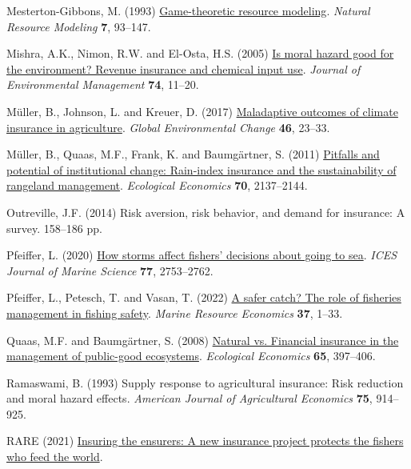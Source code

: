 \documentclass[
  letterpaper,
  DIV=11,
  numbers=noendperiod]{scrartcl}
\newlength{\cslhangindent}
\newenvironment{CSLReferences}[2] %
 {\begin{list}{}{%
  \setlength{\itemindent}{0pt}
  \setlength{\leftmargin}{0pt}
  \setlength{\parsep}{0pt}
  \ifodd #1
   \setlength{\leftmargin}{\cslhangindent}
   \setlength{\itemindent}{-1\cslhangindent}
  \fi
  \setlength{\itemsep}{#2\baselineskip}}}
 {\end{list}}
\theoremstyle{plain}
\theoremstyle{plain}
\theoremstyle{remark}
\begin{document}
\begin{CSLReferences}{1}{0}
Mesterton-Gibbons, M. (1993)
\href{https://doi.org/10.1111/j.1939-7445.1993.tb00143.x}{Game-theoretic
resource modeling}. \emph{Natural Resource Modeling} \textbf{7},
93--147.

Mishra, A.K., Nimon, R.W. and El-Osta, H.S. (2005)
\href{https://doi.org/10.1016/j.jenvman.2004.08.003}{Is moral hazard
good for the environment? Revenue insurance and chemical input use}.
\emph{Journal of Environmental Management} \textbf{74}, 11--20.

Müller, B., Johnson, L. and Kreuer, D. (2017)
\href{https://doi.org/10.1016/j.gloenvcha.2017.06.010}{Maladaptive
outcomes of climate insurance in agriculture}. \emph{Global
Environmental Change} \textbf{46}, 23--33.

Müller, B., Quaas, M.F., Frank, K. and Baumgärtner, S. (2011)
\href{https://doi.org/10.1016/j.ecolecon.2011.06.011}{Pitfalls and
potential of institutional change: Rain-index insurance and the
sustainability of rangeland management}. \emph{Ecological Economics}
\textbf{70}, 2137--2144.

Outreville, J.F. (2014) Risk aversion, risk behavior, and demand for
insurance: A survey. 158--186 pp.

Pfeiffer, L. (2020) \href{https://doi.org/10.1093/icesjms/fsaa145}{How
storms affect fishers' decisions about going to sea}. \emph{ICES Journal
of Marine Science} \textbf{77}, 2753--2762.

Pfeiffer, L., Petesch, T. and Vasan, T. (2022)
\href{https://doi.org/10.1086/716856}{A safer catch? The role of
fisheries management in fishing safety}. \emph{Marine Resource
Economics} \textbf{37}, 1--33.

Quaas, M.F. and Baumgärtner, S. (2008)
\href{https://doi.org/10.1016/j.ecolecon.2007.07.004}{Natural vs.
Financial insurance in the management of public-good ecosystems}.
\emph{Ecological Economics} \textbf{65}, 397--406.

Ramaswami, B. (1993) Supply response to agricultural insurance: Risk
reduction and moral hazard effects. \emph{American Journal of
Agricultural Economics} \textbf{75}, 914--925.

RARE (2021)
\href{https://rare.org/stories-articles/insuring-the-ensurers-rares-fish-forever-program-protects-the-fishers-who-feed-the-world/}{Insuring
the ensurers: A new insurance project protects the fishers who feed the
world}.


\end{CSLReferences}
\end{document}
